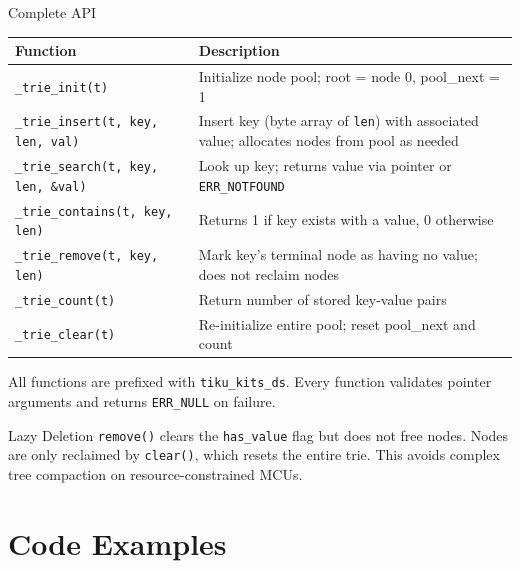 \documentclass[aspectratio=169, 10pt]{beamer}
\begin{document}
\begin{frame}[fragile]{Complete API}
\begin{table}
\centering
\small
\begin{tabular}{@{}lp{8cm}@{}}
\toprule
\textbf{Function} & \textbf{Description} \\
\midrule
\texttt{\_trie\_init(t)}
  & Initialize node pool; root = node 0, pool\_next = 1 \\
\texttt{\_trie\_insert(t, key, len, val)}
  & Insert key (byte array of \texttt{len}) with associated value;
    allocates nodes from pool as needed \\
\texttt{\_trie\_search(t, key, len, \&val)}
  & Look up key; returns value via pointer or \texttt{ERR\_NOTFOUND} \\
\texttt{\_trie\_contains(t, key, len)}
  & Returns 1 if key exists with a value, 0 otherwise \\
\texttt{\_trie\_remove(t, key, len)}
  & Mark key's terminal node as having no value;
    does not reclaim nodes \\
\midrule
\texttt{\_trie\_count(t)}
  & Return number of stored key-value pairs \\
\texttt{\_trie\_clear(t)}
  & Re-initialize entire pool; reset pool\_next and count \\
\bottomrule
\end{tabular}
\end{table}

\vspace{0.3em}
{\scriptsize All functions are prefixed with \texttt{tiku\_kits\_ds}.
Every function validates pointer arguments and returns \texttt{ERR\_NULL} on failure.}

\begin{alertblock}{Lazy Deletion}
\texttt{remove()} clears the \texttt{has\_value} flag but does not free nodes.
Nodes are only reclaimed by \texttt{clear()}, which resets the entire trie.
This avoids complex tree compaction on resource-constrained MCUs.
\end{alertblock}
\end{frame}

\section{Code Examples}
\end{document}
